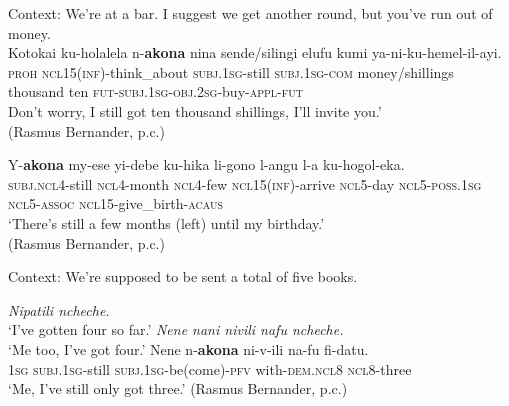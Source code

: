 \begin{exe}

	\ex\label{appendixMandaScalar1}
	Context: We're at a bar. I suggest we get another round, but you've run out of money.\\
	\gll Kotokai ku-holalela n-\textbf{akona} nina sende/silingi elufu kumi ya-ni-ku-hemel-il-ayi.\\
\textsc{proh} \textsc{ncl}15(\textsc{inf})-think\_about \textsc{subj}.1\textsc{sg}-still \textsc{subj}.1\textsc{sg}-\textsc{com} money/shillings thousand ten \textsc{fut}-\textsc{subj}.1\textsc{sg}-\textsc{obj}.2\textsc{sg}-buy-\textsc{appl}-\textsc{fut}\\
	\glt Don't worry, I still got ten thousand shillings, I'll invite you.\rq{}
	\\(Rasmus Bernander, p.c.)
	
	\ex\label{appendixMandaScalar2}
	\gll Y-\textbf{akona} my-ese yi-debe ku-hika li-gono l-angu l-a ku-hogol-eka.\\
	\textsc{subj}.\textsc{ncl}4-still \textsc{ncl}4-month \textsc{ncl}4-few \textsc{ncl}15(\textsc{inf})-arrive \textsc{ncl}5-day \textsc{ncl}5-\textsc{poss}.1\textsc{sg} \textsc{ncl}5-\textsc{assoc} \textsc{ncl}15-give\_birth-\textsc{acaus}\\
	\glt \lq{}There's still a few months (left) until my birthday.\rq{}
	\\(Rasmus Bernander, p.c.)
	
	\ex Context: We're supposed to be sent a total of five books.\label{appendixMandaScalar3}
	\begin{xlist}
		 \textit{Nipatili ncheche.}\\
		\lq I've gotten four so far.\rq
		 \textit{Nene nani nivili nafu ncheche.}\\
		\lq Me too, I've got four.\rq{}
		\gll Nene n-\textbf{akona} ni-v-ili na-fu fi-datu.\\
		1\textsc{sg} \textsc{subj}.1\textsc{sg}-still \textsc{subj}.1\textsc{sg}-be(come)-\textsc{pfv} with-\textsc{dem}.\textsc{ncl}8 \textsc{ncl}8-three\\
		\glt \lq Me, I've still only got three.\rq{ }(Rasmus Bernander, p.c.)
	\end{xlist}
\end{exe}

